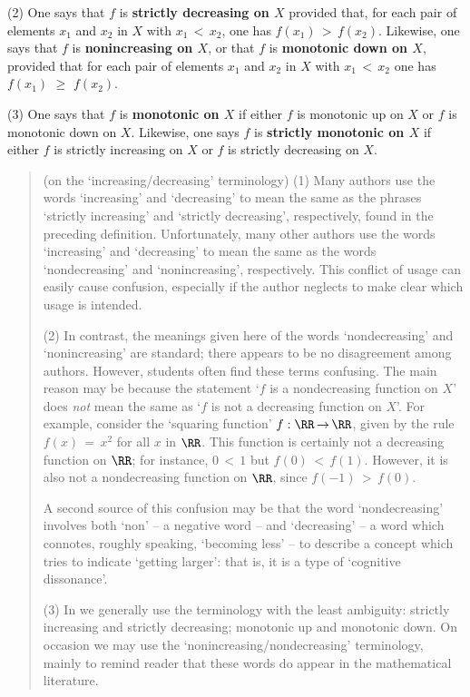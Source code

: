 \V

        (2) One says that $f$ is {\bf strictly decreasing on $X$} provided that, for each pair of elements $x_{1}$ and $x_{2}$ in $X$ with $x_{1}\,<\,x_{2}$,
    one has $f(x_{1})\,>\,f(x_{2})$. Likewise, one says that $f$ is {\bf nonincreasing on $X$}, or that $f$ is {\bf monotonic down on $X$},
    provided that for each pair of elements $x_{1}$ and $x_{2}$ in $X$ with $x_{1}\,<\,x_{2}$ one has $f(x_{1})\,\,{\geq}\,\,f(x_{2})$.

\V

        (3) One says that $f$ is {\bf monotonic on $X$} if either $f$ is monotonic up on $X$ or $f$ is monotonic down on $X$.
    Likewise, one says $f$ is {\bf strictly monotonic on $X$} if either $f$ is strictly increasing on $X$ or $f$ is strictly decreasing on $X$.

\V

\begin{quotation}
{\footnotesize \underline{\Note} (on the `increasing/decreasing' terminology)
\hspace*{\parindent}(1) Many authors use the words `increasing' and `decreasing' to mean the same as the phrases `strictly increasing' and `strictly decreasing', 
    respectively, found in the preceding definition. Unfortunately, many other authors use the words `increasing' and `decreasing'
    to mean the same as the words `nondecreasing' and `nonincreasing', respectively.
    This conflict of usage can easily cause confusion, especially if the author neglects to make clear which usage is intended.

\V

        (2) In contrast, the meanings given here of the words `nondecreasing' and `nonincreasing' are standard;
    there appears to be no disagreement among authors. However, students often find these terms confusing.
    The main reason may be because the statement `$f$ is a nondecreasing function on $X$'
    does {\em not} mean the same as `$f$ is not a decreasing function on $X$'.
    For example, consider the `squaring function' $f:{\RR} \,{\rightarrow}\, {\RR}$, given by the rule $f(x) \,=\, x^{2}$ for all $x$ in ${\RR}$.
    This function is certainly not a decreasing function on ${\RR}$; for instance, $0\,<\,1$ but $f(0)\,<\,f(1)$.
    However, it is also not a nondecreasing function on ${\RR}$, since $f(-1)\,>\,f(0)$.

        A second source of this confusion may be that the word `nondecreasing' involves both `non' --
    a negative word -- and `decreasing' -- a word which connotes, roughly speaking,
    `becoming less' -- to describe a concept which tries to indicate `getting larger': that is, it is a type of `cognitive dissonance'.

\V

        (3) In {\TheseNotes} we generally use the terminology with the least ambiguity:
    strictly increasing and strictly decreasing; monotonic up and monotonic down.
    On occasion we may use the `nonincreasing/nondecreasing' terminology, mainly to remind reader that these words do appear in the mathematical literature.
}%
\end{quotation}


